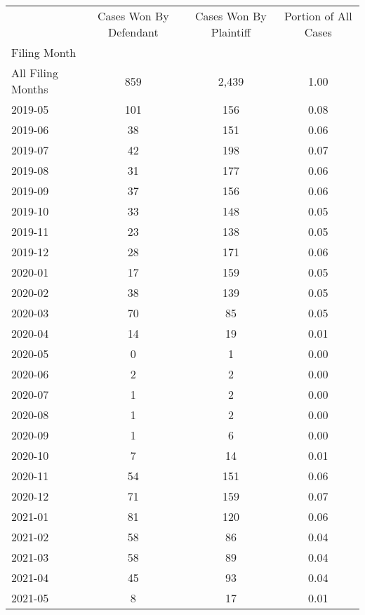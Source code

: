 \begin{tabular}{lccc}
\toprule
 & Cases Won By Defendant & Cases Won By Plaintiff & Portion of All Cases \\
Filing Month &  &  &  \\
\midrule
All Filing Months & 859 & 2,439 & 1.00 \\
2019-05 & 101 & 156 & 0.08 \\
2019-06 & 38 & 151 & 0.06 \\
2019-07 & 42 & 198 & 0.07 \\
2019-08 & 31 & 177 & 0.06 \\
2019-09 & 37 & 156 & 0.06 \\
2019-10 & 33 & 148 & 0.05 \\
2019-11 & 23 & 138 & 0.05 \\
2019-12 & 28 & 171 & 0.06 \\
2020-01 & 17 & 159 & 0.05 \\
2020-02 & 38 & 139 & 0.05 \\
2020-03 & 70 & 85 & 0.05 \\
2020-04 & 14 & 19 & 0.01 \\
2020-05 & 0 & 1 & 0.00 \\
2020-06 & 2 & 2 & 0.00 \\
2020-07 & 1 & 2 & 0.00 \\
2020-08 & 1 & 2 & 0.00 \\
2020-09 & 1 & 6 & 0.00 \\
2020-10 & 7 & 14 & 0.01 \\
2020-11 & 54 & 151 & 0.06 \\
2020-12 & 71 & 159 & 0.07 \\
2021-01 & 81 & 120 & 0.06 \\
2021-02 & 58 & 86 & 0.04 \\
2021-03 & 58 & 89 & 0.04 \\
2021-04 & 45 & 93 & 0.04 \\
2021-05 & 8 & 17 & 0.01 \\
\bottomrule
\end{tabular}

